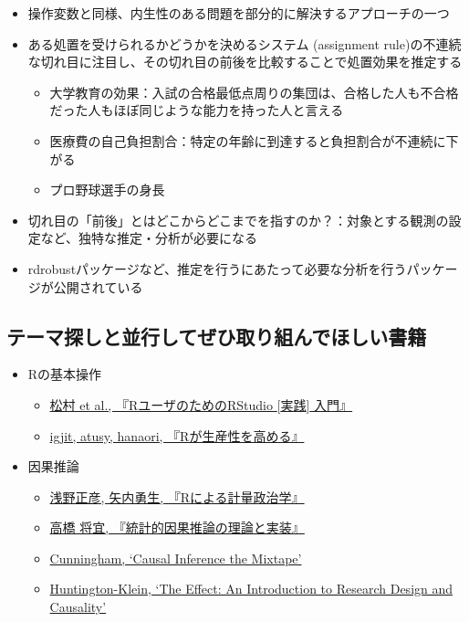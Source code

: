 \documentclass[
]{ltjsarticle}
\providecommand{\tightlist}{%
  \setlength{\itemsep}{0pt}\setlength{\parskip}{0pt}}
\begin{document}
\begin{itemize}
\tightlist
\item
  操作変数と同様、内生性のある問題を部分的に解決するアプローチの一つ
\item
  ある処置を受けられるかどうかを決めるシステム (assignment
  rule)の不連続な切れ目に注目し、その切れ目の前後を比較することで処置効果を推定する

  \begin{itemize}
  \tightlist
  \item
    大学教育の効果：入試の合格最低点周りの集団は、合格した人も不合格だった人もほぼ同じような能力を持った人と言える
  \item
    医療費の自己負担割合：特定の年齢に到達すると負担割合が不連続に下がる
  \item
    プロ野球選手の身長
  \end{itemize}
\item
  切れ目の「前後」とはどこからどこまでを指すのか？：対象とする観測の設定など、独特な推定・分析が必要になる
\item
  rdrobustパッケージなど、推定を行うにあたって必要な分析を行うパッケージが公開されている
\end{itemize}

\hypertarget{ux30c6ux30fcux30deux63a2ux3057ux3068ux4e26ux884cux3057ux3066ux305cux3072ux53d6ux308aux7d44ux3093ux3067ux307bux3057ux3044ux66f8ux7c4d}{%
\subsection{テーマ探しと並行してぜひ取り組んでほしい書籍}\label{ux30c6ux30fcux30deux63a2ux3057ux3068ux4e26ux884cux3057ux3066ux305cux3072ux53d6ux308aux7d44ux3093ux3067ux307bux3057ux3044ux66f8ux7c4d}}

\begin{itemize}
\tightlist
\item
  Rの基本操作

  \begin{itemize}
  \tightlist
  \item
    \href{https://gihyo.jp/book/2021/978-4-297-12170-9}{松村 et al.,
    『RユーザのためのRStudio {[}実践{]} 入門』}
  \item
    \href{https://gihyo.jp/book/2022/978-4-297-12524-0}{igjit, atusy,
    hanaori, 『Rが生産性を高める』}
  \end{itemize}
\item
  因果推論

  \begin{itemize}
  \tightlist
  \item
    \href{https://www.ohmsha.co.jp/book/9784274223136/}{浅野正彦,
    矢内勇生, 『Rによる計量政治学』}
  \item
    \href{https://www.kyoritsu-pub.co.jp/bookdetail/9784320112452}{高橋
    将宜, 『統計的因果推論の理論と実装』}
  \item
    \href{https://mixtape.scunning.com/}{Cunningham, `Causal Inference
    the Mixtape'}
  \item
    \href{https://theeffectbook.net/}{Huntington-Klein, `The Effect: An
    Introduction to Research Design and Causality'}
  \end{itemize}
\end{itemize}
\end{document}
